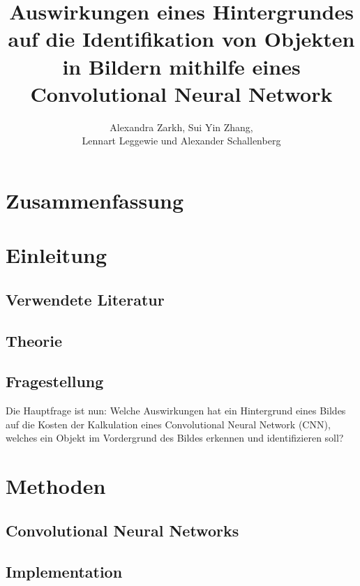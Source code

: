 \documentclass[paper=A4,pagesize=auto,12pt,headinclude=true,footinclude=true,BCOR=0mm,DIV=calc]{scrartcl}
\title{Auswirkungen eines Hintergrundes auf die Identifikation von Objekten in Bildern mithilfe eines Convolutional Neural Network}
\author{Alexandra Zarkh, Sui Yin Zhang,\\ Lennart Leggewie und Alexander Schallenberg}
\begin{document}
\begin{titlepage}
	\maketitle
\end{titlepage}

\tableofcontents
\newpage


\section{Zusammenfassung}


\section{Einleitung}

\subsection{Verwendete Literatur}

\subsection{Theorie} %

\subsection{Fragestellung}
Die Hauptfrage ist nun: Welche Auswirkungen hat ein Hintergrund eines Bildes auf die Kosten der Kalkulation eines Convolutional Neural Network (CNN), welches ein Objekt im Vordergrund des Bildes erkennen und identifizieren soll?


\section{Methoden}

\subsection{Convolutional Neural Networks} %

\subsection{Implementation}
\end{document}
